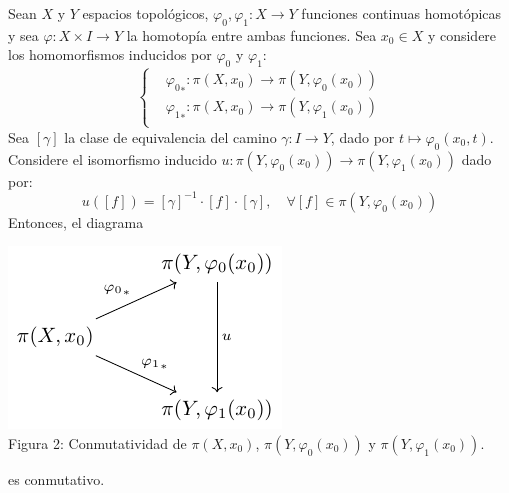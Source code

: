 \documentclass{article}
\newcounter{it}
\theoremstyle{largebreak}
\newcommand\cf[3]{\ensuremath{#1:#2\rightarrow#3}}
\begin{document}
    \begin{theor}
        Sean $X$ y $Y$ espacios topológicos, $\cf{\varphi_0,\varphi_1}{X}{Y}$ funciones continuas homotópicas y sea $\cf{\varphi}{X\times I}{Y}$ la homotopía entre ambas funciones. Sea $x_0\in X$ y considere los homomorfismos inducidos por $\varphi_0$ y $\varphi_1$:
        \begin{equation*}
            \left\{
            \begin{split}
                &\cf{{\varphi_0}_*}{\pi(X,x_0)}{\pi(Y,\varphi_0(x_0))}\\
                &\cf{{\varphi_1}_* }{\pi(X,x_0)}{\pi(Y,\varphi_1(x_0))}\\
            \end{split}
            \right.
        \end{equation*}
        Sea $[\gamma]$ la clase de equivalencia del camino $\cf{\gamma}{I}{Y}$, dado por $t\mapsto\varphi_0(x_0,t)$. Considere el isomorfismo inducido $\cf{u}{\pi(Y,\varphi_0(x_0))}{\pi(Y,\varphi_1(x_0))}$ dado por:
        \begin{equation*}
            u([f])=[\gamma]^{-1}\cdot[f]\cdot[\gamma],\quad\forall [f]\in\pi(Y,\varphi_0(x_0))
        \end{equation*}
        Entonces, el diagrama

        \begin{minipage}{\textwidth}
            \begin{center}
                \includegraphics[scale=1.5]{images/fig_4.pdf}\\
                Figura 2: Conmutatividad de $\pi(X,x_0)$, $\pi(Y,\varphi_0(x_0))$ y $\pi(Y,\varphi_1(x_0))$.
            \end{center}
        \end{minipage}

        es conmutativo.
    \end{theor}
\end{document}
